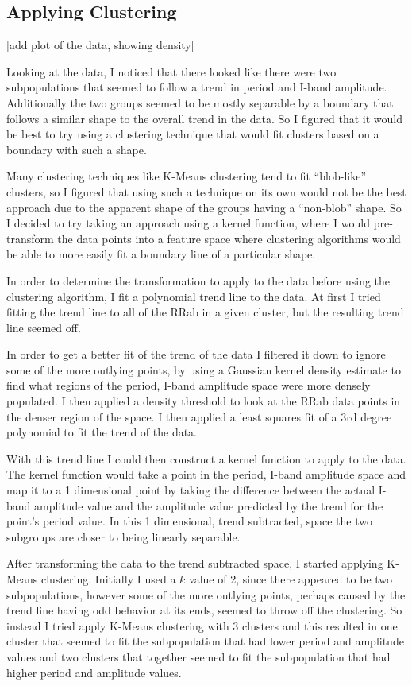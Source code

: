 \documentclass[]{article}
\begin{document}
\subsection{Applying Clustering}
[add plot of the data, showing density]

Looking at the data, I noticed that there looked like there were two subpopulations that seemed to follow a trend in period and I-band amplitude. Additionally the two groups seemed to be mostly separable by a boundary that follows a similar shape to the overall trend in the data. So I figured that it would be best to try using a clustering technique that would fit clusters based on a boundary with such a shape.

Many clustering techniques like K-Means clustering tend to fit ``blob-like'' clusters, so I figured that using such a technique on its own would not be the best approach due to the apparent shape of the groups having a ``non-blob'' shape. So I decided to try taking an approach using a kernel function, where I would pre-transform the data points into a feature space where clustering algorithms would be able to more easily fit a boundary line of a particular shape.

In order to determine the transformation to apply to the data before using the clustering algorithm, I fit a polynomial trend line to the data. At first I tried fitting the trend line to all of the RRab in a given cluster, but the resulting trend line seemed off.

In order to get a better fit of the trend of the data I filtered it down to ignore some of the more outlying points, by using a Gaussian kernel density estimate to find what regions of the period, I-band amplitude space were more densely populated. I then applied a density threshold to look at the RRab data points in the denser region of the space. I then applied a least squares fit of a 3rd degree polynomial to fit the trend of the data.

With this trend line I could then construct a kernel function to apply to the data. The kernel function would take a point in the period, I-band amplitude space and map it to a 1 dimensional point by taking the  difference between the actual I-band amplitude value and the amplitude value predicted by the trend for the point's period value. In this 1 dimensional, trend subtracted, space the two subgroups are closer to being linearly separable.

After transforming the data to the trend subtracted space, I started applying K-Means clustering. Initially I used a $k$ value of 2, since there appeared to be two subpopulations, however some of the more outlying points, perhaps caused by the trend line having odd behavior at its ends, seemed to throw off the clustering. So instead I tried apply K-Means clustering with 3 clusters and this resulted in one cluster that seemed to fit the subpopulation that had lower period and amplitude values and two clusters that together seemed to fit the subpopulation that had higher period and amplitude values.
\end{document}
